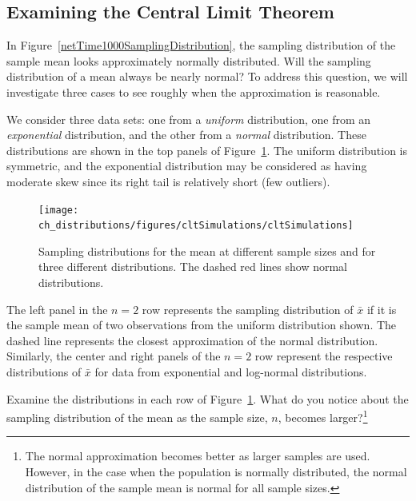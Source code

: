 \subsection{Examining the Central Limit Theorem}
\label{cltSection}


In Figure~\ref{netTime1000SamplingDistribution}, the sampling distribution of the sample mean looks approximately normally distributed.  Will the sampling distribution of a mean always be nearly normal? To address this question, we will investigate three cases to see roughly when the approximation is reasonable.

We consider three data sets: one from a \emph{uniform} distribution, one from an \emph{exponential} distribution, and the other from a \emph{normal} distribution. These distributions are shown in the top panels of Figure~\ref{cltSimulations}. The uniform distribution is symmetric, and the exponential distribution may be considered as having moderate skew since its right tail is relatively short (few outliers).

\begin{figure}
   \centering
   \texttt{[image: ch\_distributions/figures/cltSimulations/cltSimulations]}
   \caption{Sampling distributions for the mean at different sample sizes and for three different distributions. The dashed red lines show normal distributions.}
   \label{cltSimulations}
\end{figure}

The left panel in the $n=2$ row represents the sampling distribution of $\bar{x}$ if it is the sample mean of two observations from the uniform distribution shown. The dashed line represents the closest approximation of the normal distribution. Similarly, the center and right panels of the $n=2$ row represent the respective distributions of $\bar{x}$ for data from exponential and log-normal distributions.

\begin{exercise}
Examine the distributions in each row of Figure~\ref{cltSimulations}. What do you notice about the sampling distribution of the mean as the sample size, $n$, becomes larger?\footnote{The normal approximation becomes better as larger samples are used. However, in the case when the population is normally distributed, the normal distribution of the sample mean is normal for all sample sizes.}
\end{exercise}

